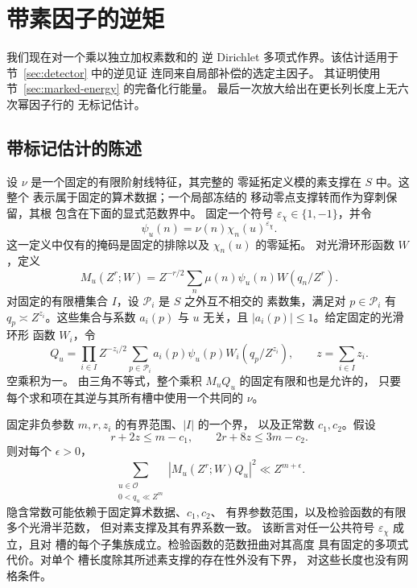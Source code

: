 \section{带素因子的逆矩}\label{sec:inverse}

我们现在对一个乘以独立加权素数和的
逆 Dirichlet 多项式作界。该估计适用于节~\ref{sec:detector} 中的逆见证
连同来自局部补偿的选定主因子。
其证明使用节~\ref{sec:marked-energy} 的完备化行能量。
最后一次放大给出在更长列长度上无六次幂因子行的
无标记估计。

\subsection{带标记估计的陈述}

设 \(\nu\) 是一个固定的有限阶射线特征，其完整的
零延拓定义模的素支撑在 \(S\) 中。这整个
表示属于固定的算术数据；一个局部冻结的
移动零点支撑转而作为穿刺保留，其根
包含在下面的显式范数界中。
固定一个符号 \(\varepsilon_\chi\in\{1,-1\}\)，并令
\[
 \psi_u(n)=\nu(n)\chi_n(u)^{\varepsilon_\chi}.
\]
这一定义中仅有的掩码是固定的排除以及
\(\chi_n(u)\) 的零延拓。
对光滑环形函数 \(W\)，定义
\[
 M_u(Z^r;W)=Z^{-r/2}\sum_n\mu(n)\psi_u(n)W(q_n/Z^r).
\]
对固定的有限槽集合 \(I\)，设 \(\mathcal P_i\) 是 \(S\) 之外互不相交的
素数集，满足对
\(p\in\mathcal P_i\) 有 \(q_p\asymp Z^{z_i}\)。这些集合与系数 \(a_i(p)\)
与 \(u\) 无关，且 \(|a_i(p)|\le1\)。给定固定的光滑环形
函数 \(W_i\)，令
\[
 Q_u=\prod_{i\in I}Z^{-z_i/2}
       \sum_{p\in\mathcal P_i}a_i(p)\psi_u(p)W_i(q_p/Z^{z_i}),
 \qquad z=\sum_{i\in I}z_i.
\]
空乘积为一。
由三角不等式，整个乘积 \(M_uQ_u\) 的固定有限和也是允许的，
只要每个求和项在其逆与其所有槽中使用一个共同的
\(\nu\)。

\begin{lemma}[带标记的逆矩]\label{lem:marked}
固定非负参数 \(m,r,z_i\) 的有界范围、\(|I|\) 的一个界，
以及正常数 \(c_1,c_2\)。假设
\[
 r+2z\le m-c_1,\qquad 2r+8z\le3m-c_2.
\]
则对每个 \(\epsilon>0\)，
\begin{equation}\label{old-eq:4.1}
 \sum_{\substack{u\in\mathcal O\\0<q_u\ll Z^m}}
       |M_u(Z^r;W)Q_u|^2\ll Z^{m+\epsilon}.
\end{equation}
隐含常数可能依赖于固定算术数据、\(c_1,c_2\)、
有界参数范围，以及检验函数的有限多个光滑半范数，
但对素支撑及其有界系数一致。
该断言对任一公共符号 \(\varepsilon_\chi\) 成立，且对
槽的每个子集族成立。检验函数的范数扭曲对其高度
具有固定的多项式代价。对单个
槽长度除其所述素支撑的存在性外没有下界，
对这些长度也没有网格条件。
\end{lemma}


